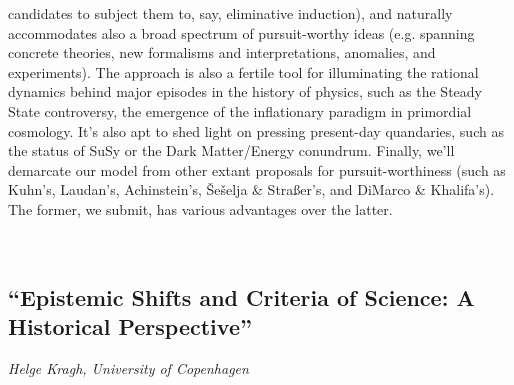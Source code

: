 \documentclass[11pt]{article}
\begin{document}
candidates to subject them to, say, eliminative induction), and naturally accommodates also a broad
spectrum of pursuit-worthy ideas (e.g. spanning concrete theories, new formalisms and interpretations,
anomalies, and experiments). The approach is also a fertile tool for illuminating the rational dynamics
behind major episodes in the history of physics, such as the Steady State controversy, the emergence of
the inflationary paradigm in primordial cosmology. It’s also apt to shed light on pressing present-day
quandaries, such as the status of SuSy or the Dark Matter/Energy conundrum.
Finally, we’ll demarcate our model from other extant proposals for pursuit-worthiness (such as Kuhn’s,
Laudan’s, Achinstein’s, Šešelja \& Straßer’s, and DiMarco \& Khalifa’s). The former, we submit, has various
advantages over the latter.

\

\subsection*{\textsf{``Epistemic Shifts and Criteria of
Science: A Historical Perspective''}}

\textcolor{moderncvgreen}{
\textit{Helge Kragh, University of Copenhagen
}
}

\
\end{document}
